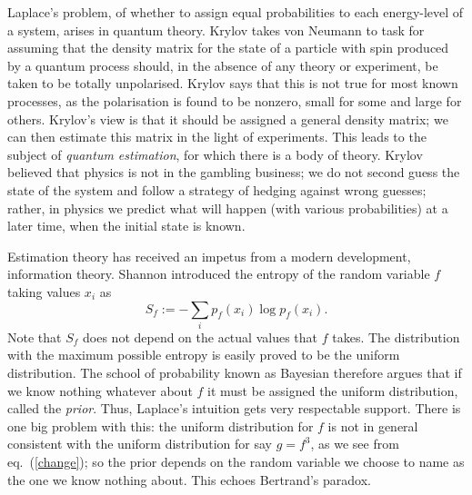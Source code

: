 Laplace's problem, of whether to assign equal probabilities to each
energy-level of a system, arises in quantum theory.
Krylov takes von
Neumann to task for assuming that the density matrix for the state of a
particle with spin produced by a quantum process should, in the absence
of any theory or experiment, be taken to be totally unpolarised. Krylov
says that this is not true for most known processes, as the polarisation
is found to be nonzero, small for some and large for others.
Krylov's view is that it should be assigned
a general density matrix; we can then estimate this matrix in the light of
experiments. This leads to the subject of {\em quantum estimation},
for which there is a body of theory. Krylov
believed that physics is not in the gambling business; we do not second
guess the state of the system and follow a strategy of hedging against
wrong guesses; rather, in physics we predict what will happen (with various
probabilities) at a later time, when the initial state is known.

Estimation theory has received an impetus from a modern development,
information theory.
Shannon introduced the entropy of the random variable $f$ taking values
$x_i$ as
\begin{equation}
S_f:=-\sum_i p_f(x_i)\log p_f(x_i).
\end{equation}
Note that
$S_f$ does not depend on the actual values that $f$ takes. The distribution
with the maximum possible entropy is easily proved to be the uniform
distribution. The school of probability known as Bayesian therefore argues
that if we know nothing whatever about $f$ it must be assigned the uniform
distribution, called the {\em prior}. Thus, Laplace's
intuition gets very respectable support. There is one big problem with this:
the uniform distribution for $f$ is not in general consistent with
the uniform distribution for say $g=f^3$, as we see from eq.~(\ref{change});
so the prior depends on the
random variable we choose to name as the one we know nothing about. This
echoes Bertrand's paradox.

